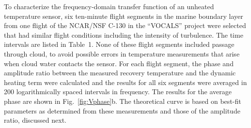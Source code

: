 \documentclass[amt, manuscript]{copernicus}
\begin{document}
To characterize the frequency-domain transfer function of an unheated
temperature sensor, six ten-minute flight segments in the marine
boundary layer from one flight of the NCAR/NSF C-130 in the ``VOCALS''
project \citep{wood2011vamos} were selected that had similar flight
conditions including the intensity of turbulence. The time intervals are
listed in Table~1. None of these flight segments included passage
through cloud, to avoid possible errors in temperature measurements that
arise when cloud water contacts the sensor. For each flight segment, the
phase and amplitude ratio between the measured recovery temperature and
the dynamic heating term were calculated and the results for all six
segments were averaged in 200 logarithmically spaced intervals in
frequency. The results for the average phase are shown in
Fig.~\ref{fig:Vphase}b. The theoretical curve is based on best-fit
parameters as determined from these measurements and those of the
amplitude ratio, discussed next.
\end{document}
